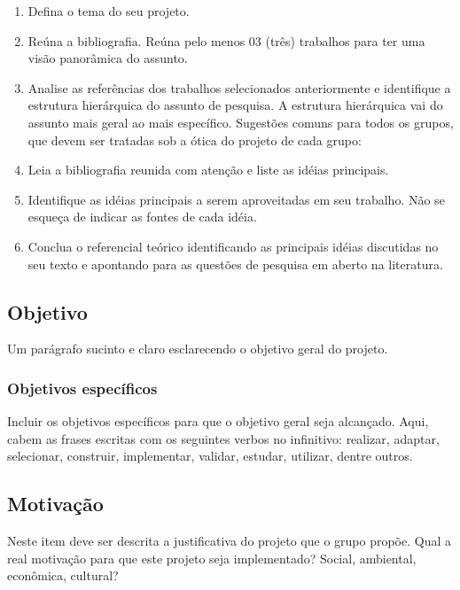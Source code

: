 \documentclass[10pt]{article}
\begin{document}
\begin{enumerate}
\item Defina o tema do seu projeto.
\item Reúna a bibliografia. Reúna pelo menos 03 (três) trabalhos para ter uma visão panorâmica do assunto.
\item Analise as referências dos trabalhos selecionados anteriormente e identifique a estrutura hierárquica do assunto de pesquisa. A estrutura hierárquica vai do assunto mais geral ao mais específico. Sugestões comuns para todos os grupos, que devem ser tratadas sob a ótica do projeto de cada grupo:

\item{Leia a bibliografia reunida com atenção e liste as idéias principais.}
\item{Identifique as idéias principais a serem aproveitadas em seu trabalho. Não se esqueça de indicar as fontes de cada idéia.}
\item{Conclua o referencial teórico identificando as principais idéias discutidas no seu texto e apontando para as questões de pesquisa em aberto na literatura.}
\end{enumerate}

\subsection{Objetivo}

Um parágrafo sucinto e claro esclarecendo o objetivo geral do projeto.

\subsubsection{Objetivos específicos}

Incluir os objetivos específicos para que o objetivo geral seja alcançado. Aqui, cabem as frases escritas com os seguintes verbos no infinitivo: realizar, adaptar, selecionar, construir, implementar, validar, estudar, utilizar, dentre outros.

\subsection{Motivação}

Neste item deve ser descrita a justificativa do projeto que o grupo propõe. Qual a real motivação para que este projeto seja implementado? Social, ambiental, econômica, cultural? 
\end{document}
